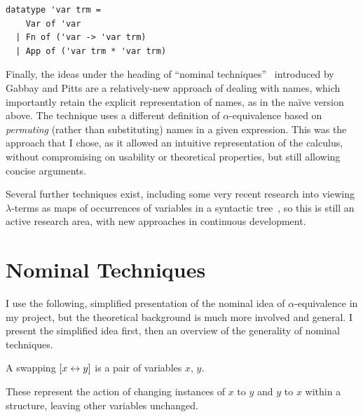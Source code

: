 \begin{verbatim}
datatype 'var trm =
    Var of 'var
  | Fn of ('var -> 'var trm)
  | App of ('var trm * 'var trm)
\end{verbatim}

Finally, the ideas under the heading of ``nominal techniques''~\cite{nominal} introduced by Gabbay and Pitts are a relatively-new approach of dealing with names, which importantly retain the explicit representation of names, as in the na\"ive version above.
The technique uses a different definition of \(\alpha\)-equivalence based on \emph{permuting} (rather than substituting) names in a given expression.
This was the approach that I chose, as it allowed an intuitive representation of the calculus, without compromising on usability or theoretical properties, but still allowing concise arguments.

Several further techniques exist, including some very recent research into viewing \(\lambda\)-terms as maps of occurrences of variables in a syntactic tree~\cite{term-maps}, so this is still an active research area, with new approaches in continuous development.

\section{Nominal Techniques}
\label{sec:nominal-intro}
I use the following, simplified presentation of the nominal idea of \(\alpha\)-equivalence in my project, but the theoretical background is much more involved and general.
I present the simplified idea first, then an overview of the generality of nominal techniques.

\begin{definition}
A swapping \([x \leftrightarrow y]\) is a pair of variables \(x\), \(y\).
\end{definition}

These represent the action of changing instances of \(x\) to \(y\) and \(y\) to \(x\) within a structure, leaving other variables unchanged.

